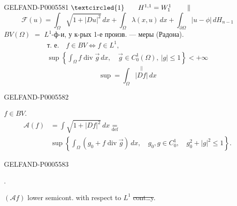 \begin{GelfandAdjacentEvidence}{GELFAND-P000558}{1}
\(\textcircled{1}\qquad H^{1,1}=W_1^1\qquad\parallel\)
\[
\mathcal F(u)=\int_\Omega\sqrt{1+|Du|^2}\,dx+
\int_\Omega\lambda(x,u)\,dx+
\int_{\partial\Omega}|u-\phi|\,dH_{n-1}
\]
\(BV(\Omega)\) \(=\) \(L^1\)-ф-и, у к-рых 1-е произв. — меры (Радона).
\[
\begin{gathered}
\text{т. е.}\quad f\in BV \iff f\in L^1,\\
\sup\left\{\int_\Omega f\operatorname{div}\vec g\,dx,\quad
\vec g\in C_0^1(\Omega),\ |g|\le1\right\}<+\infty
\end{gathered}
\]
\[
\sup=\int_\Omega \overset{\vert\vert}{|Df|}\,dx
\]
\end{GelfandAdjacentEvidence}
\begin{GelfandAdjacentEvidence}{GELFAND-P000558}{2}

\quad \underline{\(f\in BV.\)}
\[
\begin{aligned}
\mathcal A(f)&=\int\sqrt{1+|Df|^2}\,dx\underset{\mathrm{def}}{=}\\
&\sup\left\{\int_\Omega(g_0+f\operatorname{div}\vec g)\,dx,\quad
g_0,g\in C_0^1,\quad g_0^2+|g|^2\le1\right\}.
\end{aligned}
\]
\end{GelfandAdjacentEvidence}
\begin{GelfandAdjacentEvidence}{GELFAND-P000558}{3}

.

\((\mathcal A f)\) lower semicont. with respect to \(L^1\) \sout{cont\ldots y}.
\end{GelfandAdjacentEvidence}
